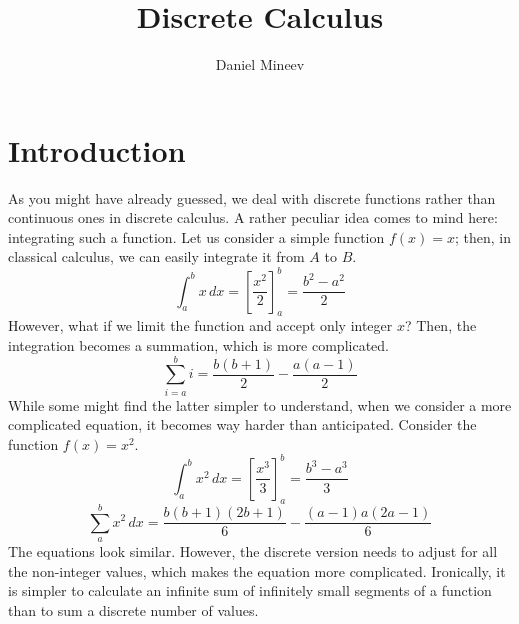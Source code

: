 \documentclass{article}
\title{Discrete Calculus}
\author{Daniel Mineev}
\date{}
\begin{document}
\maketitle

\section{Introduction}

As you might have already guessed, we deal with discrete functions rather than continuous ones in discrete calculus. A rather peculiar idea comes to mind here: integrating such a function. Let us consider a simple function \(f(x) = x\); then, in classical calculus, we can easily integrate it from \(A\) to \(B\).
\begin{equation}
	\int_{a}^{b} x \,dx = \left[ \frac{x^2}{2} \right] ^{b}_{a} = \frac{b^2 - a^2}{2}
\end{equation}
However, what if we limit the function and accept only integer \(x\)? Then, the integration becomes a summation, which is more complicated.
\begin{equation}
	\sum_{i = a}^b i = \frac{b(b + 1)}{2} - \frac{a(a - 1)}{2}
\end{equation}
While some might find the latter simpler to understand, when we consider a more complicated equation, it becomes way harder than anticipated. Consider the function \(f(x) = x^2\).
\begin{equation}
	\int_{a}^{b} x^2 \,dx = \left[ \frac{x^3}{3} \right] ^{b}_{a} = \frac{b^3 - a^3}{3}
\end{equation}
\begin{equation}
	\sum_{a}^{b} x^2 \,dx = \frac{b(b + 1)(2b + 1)}{6} - \frac{(a - 1)a(2a - 1)}{6}
\end{equation}
The equations look similar. However, the discrete version needs to adjust for all the non-integer values, which makes the equation more complicated. Ironically, it is simpler to calculate an infinite sum of infinitely small segments of a function than to sum a discrete number of values.
\end{document}
